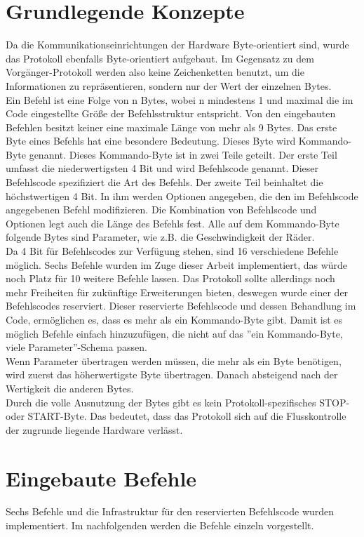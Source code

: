 \section{Grundlegende Konzepte}
Da die Kommunikationseinrichtungen der Hardware Byte-orientiert sind, wurde das
Protokoll ebenfalls Byte-orientiert aufgebaut. Im Gegensatz zu dem Vorgänger-Protokoll
werden also keine Zeichenketten benutzt, um die Informationen zu repräsentieren, sondern
nur der Wert der einzelnen Bytes.\\
Ein Befehl ist eine Folge von n Bytes, wobei n mindestens 1 und maximal die im Code
eingestellte Größe der Befehlsstruktur entspricht. Von den eingebauten Befehlen besitzt
keiner eine maximale Länge von mehr als 9 Bytes. Das erste Byte eines Befehls hat eine
besondere Bedeutung. Dieses Byte wird Kommando-Byte genannt. Dieses Kommando-Byte
ist in zwei Teile geteilt. Der erste Teil umfasst die niederwertigsten 4 Bit und
wird Befehlscode genannt. Dieser Befehlscode spezifiziert die Art des Befehls.
Der zweite Teil beinhaltet die höchstwertigen 4 Bit. In ihm werden Optionen
angegeben, die den im Befehlscode angegebenen Befehl modifizieren. Die Kombination
von Befehlscode und Optionen legt auch die Länge des Befehls fest. Alle auf dem
Kommando-Byte folgende Bytes sind Parameter, wie z.B. die Geschwindigkeit der Räder.\\
Da 4 Bit für Befehlscodes zur Verfügung stehen, sind 16 verschiedene Befehle möglich.
Sechs Befehle wurden im Zuge dieser Arbeit implementiert, das würde noch Platz für
10 weitere Befehle lassen. Das Protokoll sollte allerdings noch mehr Freiheiten
für zukünftige Erweiterungen bieten, deswegen wurde einer der Befehlscodes
reserviert. Dieser reservierte Befehlscode und dessen Behandlung im Code, ermöglichen
es, dass es mehr als ein Kommando-Byte gibt. Damit ist es möglich Befehle einfach 
hinzuzufügen, die nicht auf das ''ein Kommando-Byte, viele Parameter''-Schema passen.\\
Wenn Parameter übertragen werden müssen, die mehr als ein Byte benötigen, wird zuerst
das höherwertigste Byte übertragen. Danach absteigend nach der Wertigkeit die anderen
Bytes.\\
Durch die volle Ausnutzung der Bytes gibt es kein Protokoll-spezifisches STOP- oder START-Byte.
Das bedeutet, dass das Protokoll sich auf die Flusskontrolle der zugrunde liegende Hardware
verlässt.

\section{Eingebaute Befehle}
Sechs Befehle und die Infrastruktur für den reservierten Befehlscode wurden implementiert.
Im nachfolgenden werden die Befehle einzeln vorgestellt.

